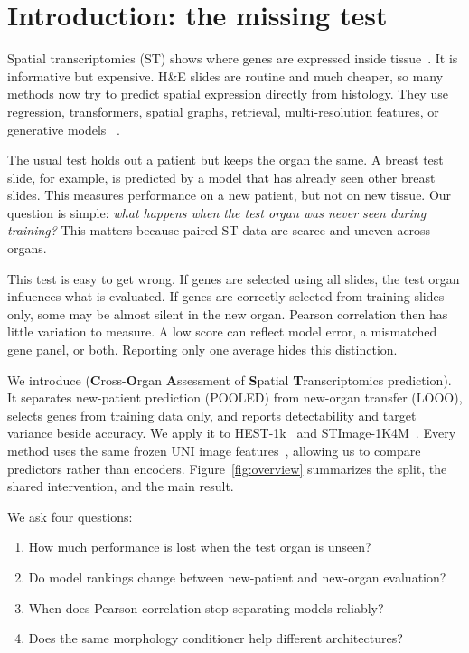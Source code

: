 \section{Introduction: the missing test}
\label{sec:intro}
Spatial transcriptomics (ST) shows where genes are expressed inside tissue~\cite{spatialtx,xenium}.
It is informative but expensive. H\&E slides are routine and much cheaper, so many methods now try to
predict spatial expression directly from histology. They use regression, transformers, spatial graphs,
retrieval, multi-resolution features, or generative models
~\cite{stnet,histogene,hist2st,bleep,triplex,stflow}.

The usual test holds out a patient but keeps the organ the same. A breast test slide, for example, is
predicted by a model that has already seen other breast slides. This measures performance on a new
patient, but not on new tissue. Our question is simple: \emph{what happens when the test organ was never
seen during training?} This matters because paired ST data are scarce and uneven across organs.

This test is easy to get wrong. If genes are selected using all slides, the test organ influences what
is evaluated. If genes are correctly selected from training slides only, some may be almost silent in
the new organ. Pearson correlation then has little variation to measure. A low score can reflect model
error, a mismatched gene panel, or both. Reporting only one average hides this distinction.

We introduce \coast{} (\textbf{C}ross-\textbf{O}rgan \textbf{A}ssessment of \textbf{S}patial
\textbf{T}ranscriptomics prediction). It separates new-patient prediction (POOLED) from new-organ
transfer (LOOO), selects genes from training data only, and reports detectability and target variance
beside accuracy. We apply it to HEST-1k~\cite{hest} and STImage-1K4M~\cite{stimage}. Every method uses
the same frozen UNI image features~\cite{uni}, allowing us to compare predictors rather than encoders.
Figure~\ref{fig:overview} summarizes the split, the shared intervention, and the main result.

We ask four questions:
\begin{enumerate}
  \item How much performance is lost when the test organ is unseen?
  \item Do model rankings change between new-patient and new-organ evaluation?
  \item When does Pearson correlation stop separating models reliably?
  \item Does the same morphology conditioner help different architectures?
\end{enumerate}

